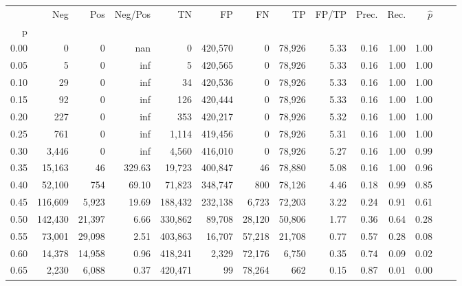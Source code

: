 \begin{tabular}{rrrrrrrrrrrrrr}
\toprule
{} &      Neg &     Pos & Neg/Pos &       TN &       FP &      FN &      TP & FP/TP & Prec. &  Rec. & $\hat{p}$ \\
p    &          &         &         &          &          &         &         &       &       &       &           \\
\midrule
0.00 &        0 &       0 &     nan &        0 &  420,570 &       0 &  78,926 &  5.33 &  0.16 &  1.00 &      1.00 \\
0.05 &        5 &       0 &     inf &        5 &  420,565 &       0 &  78,926 &  5.33 &  0.16 &  1.00 &      1.00 \\
0.10 &       29 &       0 &     inf &       34 &  420,536 &       0 &  78,926 &  5.33 &  0.16 &  1.00 &      1.00 \\
0.15 &       92 &       0 &     inf &      126 &  420,444 &       0 &  78,926 &  5.33 &  0.16 &  1.00 &      1.00 \\
0.20 &      227 &       0 &     inf &      353 &  420,217 &       0 &  78,926 &  5.32 &  0.16 &  1.00 &      1.00 \\
0.25 &      761 &       0 &     inf &    1,114 &  419,456 &       0 &  78,926 &  5.31 &  0.16 &  1.00 &      1.00 \\
0.30 &    3,446 &       0 &     inf &    4,560 &  416,010 &       0 &  78,926 &  5.27 &  0.16 &  1.00 &      0.99 \\
0.35 &   15,163 &      46 &  329.63 &   19,723 &  400,847 &      46 &  78,880 &  5.08 &  0.16 &  1.00 &      0.96 \\
0.40 &   52,100 &     754 &   69.10 &   71,823 &  348,747 &     800 &  78,126 &  4.46 &  0.18 &  0.99 &      0.85 \\
0.45 &  116,609 &   5,923 &   19.69 &  188,432 &  232,138 &   6,723 &  72,203 &  3.22 &  0.24 &  0.91 &      0.61 \\
0.50 &  142,430 &  21,397 &    6.66 &  330,862 &   89,708 &  28,120 &  50,806 &  1.77 &  0.36 &  0.64 &      0.28 \\
0.55 &   73,001 &  29,098 &    2.51 &  403,863 &   16,707 &  57,218 &  21,708 &  0.77 &  0.57 &  0.28 &      0.08 \\
0.60 &   14,378 &  14,958 &    0.96 &  418,241 &    2,329 &  72,176 &   6,750 &  0.35 &  0.74 &  0.09 &      0.02 \\
0.65 &    2,230 &   6,088 &    0.37 &  420,471 &       99 &  78,264 &     662 &  0.15 &  0.87 &  0.01 &      0.00 \\

\end{tabular}
